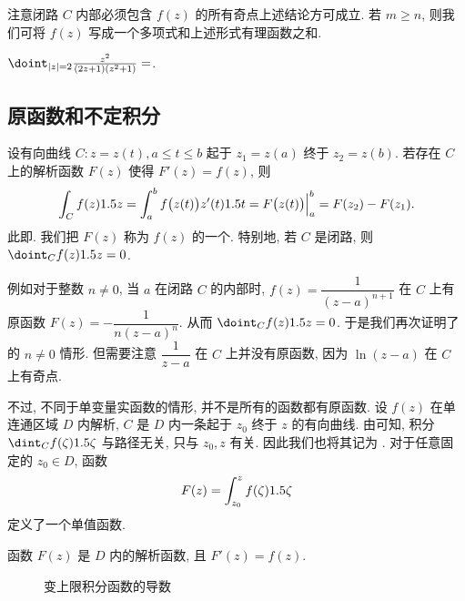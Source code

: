 注意闭路 $C$ 内部必须包含 $f(z)$ 的所有奇点上述结论方可成立.
若 $m\ge n$, 则我们可将 $f(z)$ 写成一个多项式和上述形式有理函数之和.

\begin{exercise}
  $\doint_{|z|=2}\frac{z^2}{(2z+1)(z^2+1)}=$\fillblank{}.
\end{exercise}


\subsection{原函数和不定积分}

设有向曲线 $C:z=z(t),a\le t\le b$ 起于 $z_1=z(a)$ 终于 $z_2=z(b)$.
若存在 $C$ 上的解析函数 $F(z)$ 使得 $F'(z)=f(z)$, 则
\begin{equation}
  \label{eq:newton-leibniz}
   \int_C f(z)1.5 z
  =\int_a^b f\bigl(z(t)\bigr)z'(t)1.5 t
  =F\bigl(z(t)\bigr)\Big|_a^b
  =F(z_2)-F(z_1).
\end{equation}
此即.
我们把 $F(z)$ 称为 $f(z)$ 的一个.
特别地, 若 $C$ 是闭路, 则 $\doint_C f(z)\d z=0$.

例如对于整数 $n\neq0$, 当 $a$ 在闭路 $C$ 的内部时, $f(z)=\dfrac1{(z-a)^{n+1}}$ 在 $C$ 上有原函数 $F(z)=-\dfrac1{n(z-a)^n}$.
从而 $\doint_C f(z)\d z=0$. 
于是我们再次证明了 的 $n\neq0$ 情形.
但需要注意 $\dfrac1{z-a}$ 在 $C$ 上并没有原函数, 因为 $\ln(z-a)$ 在 $C$ 上有奇点.

不过, 不同于单变量实函数的情形, 并不是所有的函数都有原函数.
设 $f(z)$ 在单连通区域 $D$ 内解析, $C$ 是 $D$ 内一条起于 $z_0$ 终于 $z$ 的有向曲线.
由\thmCG 可知, 积分 $\dint_C f(\zeta)\d \zeta$ 与路径无关, 只与 $z_0,z$ 有关.
因此我们也将其记为 .
对于任意固定的 $z_0\in D$, 函数
\[
  F(z)=\int_{z_0}^zf(\zeta)1.5\zeta
\]
定义了一个单值函数.

\begin{theorem}
  \label{thm:primitive-function}
  函数 $F(z)$ 是 $D$ 内的解析函数, 且 $F'(z)=f(z)$.
\end{theorem}

\begin{figure}[!htb]
  \centering
  \caption{变上限积分函数的导数}
\end{figure}

